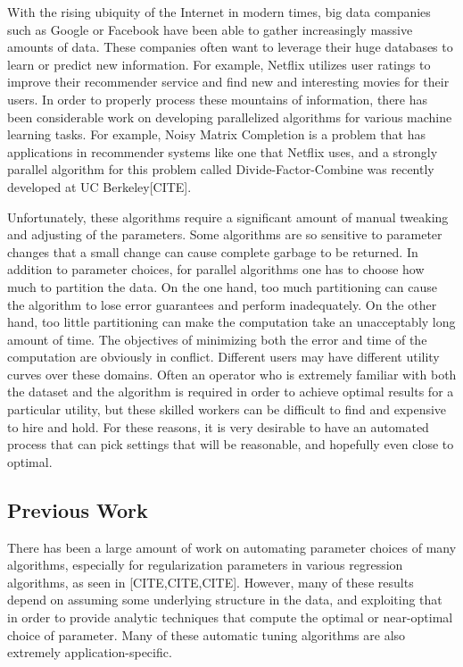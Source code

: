 With the rising ubiquity of the Internet in modern times, big data companies such as Google or Facebook have been able to gather increasingly massive amounts of data. These companies often want to leverage their huge databases to learn or predict new information. For example, Netflix utilizes user ratings to improve their recommender service and find new and interesting movies for their users. In order to properly process these mountains of information, there has been considerable work on developing parallelized algorithms for various machine learning tasks. For example, Noisy Matrix Completion is a problem that has applications in recommender systems like one that Netflix uses, and a strongly parallel algorithm for this problem called Divide-Factor-Combine was recently developed at UC Berkeley[CITE]. 

Unfortunately, these algorithms require a significant amount of manual tweaking and adjusting of the parameters. Some algorithms are so sensitive to parameter changes that a small change can cause complete garbage to be returned. In addition to parameter choices, for parallel algorithms one has to choose how much to partition the data. On the one hand, too much partitioning can cause the algorithm to lose error guarantees and perform inadequately. On the other hand, too little partitioning can make the computation take an unacceptably long amount of time. The objectives of minimizing both the error and time of the computation are obviously in conflict. Different users may have different utility curves over these domains. Often an operator who is extremely familiar with both the dataset and the algorithm is required in order to achieve optimal results for a particular utility, but these skilled workers can be difficult to find and expensive to hire and hold. For these reasons, it is very desirable to have an automated process that can pick settings that will be reasonable, and hopefully even close to optimal. 

\subsection{Previous Work}
There has been a large amount of work on automating parameter choices of many algorithms, especially for regularization parameters in various regression algorithms, as seen in [CITE,CITE,CITE]. However, many of these results depend on assuming some underlying structure in the data, and exploiting that in order to provide analytic techniques that compute the optimal or near-optimal choice of parameter. Many of these automatic tuning algorithms are also extremely application-specific. 

